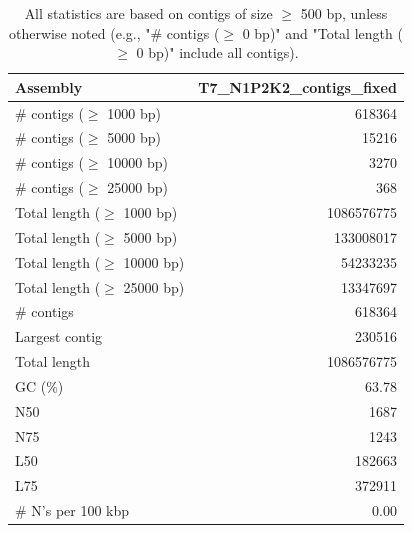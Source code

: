 \documentclass[12pt,a4paper]{article}
\begin{document}
\begin{table}[ht]
\begin{center}
\caption{All statistics are based on contigs of size $\geq$ 500 bp, unless otherwise noted (e.g., "\# contigs ($\geq$ 0 bp)" and "Total length ($\geq$ 0 bp)" include all contigs).}
\begin{tabular}{|l*{1}{|r}|}
\hline
Assembly & T7\_N1P2K2\_contigs\_fixed \\ \hline
\# contigs ($\geq$ 1000 bp) & 618364 \\ \hline
\# contigs ($\geq$ 5000 bp) & 15216 \\ \hline
\# contigs ($\geq$ 10000 bp) & 3270 \\ \hline
\# contigs ($\geq$ 25000 bp) & 368 \\ \hline
Total length ($\geq$ 1000 bp) & 1086576775 \\ \hline
Total length ($\geq$ 5000 bp) & 133008017 \\ \hline
Total length ($\geq$ 10000 bp) & 54233235 \\ \hline
Total length ($\geq$ 25000 bp) & 13347697 \\ \hline
\# contigs & 618364 \\ \hline
Largest contig & 230516 \\ \hline
Total length & 1086576775 \\ \hline
GC (\%) & 63.78 \\ \hline
N50 & 1687 \\ \hline
N75 & 1243 \\ \hline
L50 & 182663 \\ \hline
L75 & 372911 \\ \hline
\# N's per 100 kbp & 0.00 \\ \hline
\end{tabular}
\end{center}
\end{table}
\end{document}
